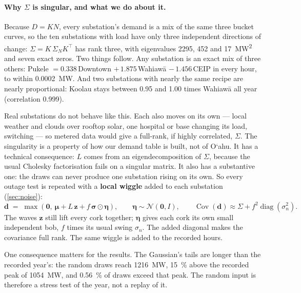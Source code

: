 \documentclass[11pt,a4paper]{article}
\newcommand{\okina}{\textquoteleft}
\newcommand{\Oahu}{O\okina ahu}
\begin{document}
\paragraph{Why $\Sigma$ is singular, and what we do about it.} Because $D = KN$,
every substation's demand is a mix of the same three bucket
curves, so the ten substations with load have only three independent directions of
change: $\Sigma = K\,\Sigma_N K^{\top}$ has rank three, with eigenvalues
\num{2295}, \num{452} and \SI{17}{MW^2} and seven exact zeros. Two things follow.
Any substation is an exact mix of three others: Pukele $= 0.338\,$Downtown
$+\,1.875\,$Wahiaw\=a $-\,1.456\,$CEIP in every hour, to within \SI{0.0002}{MW}. And two
substations with nearly the same recipe are nearly proportional: Koolau stays between
0.95 and 1.00 times Wahiaw\=a all year (correlation 0.999).

Real substations do not behave like this. Each also moves on its own --- local weather
and clouds over rooftop solar, one hospital or base changing its load, switching ---
so metered data would give a full-rank, if highly correlated, $\Sigma$. The singularity
is a property of how our demand table is built, not of \Oahu. It has a technical
consequence: $L$ comes from an eigendecomposition of $\Sigma$, because the usual
Cholesky factorisation fails on a singular matrix. It also has a substantive one: the
draws can never produce one substation rising on its own. So every outage test is
repeated with a \textbf{local wiggle} added to each substation (\cref{sec:noise}):
\begin{equation}
  \mathbf{d} \;=\; \max\!\left(\mathbf{0},\ \boldsymbol{\mu} + L\,\mathbf{z}
  + f\,\boldsymbol{\sigma}\odot\boldsymbol{\eta}\right),
  \qquad \boldsymbol{\eta} \sim \mathcal{N}(\mathbf{0}, I),
  \qquad \operatorname{Cov}(\mathbf{d}) \approx \Sigma + f^2\operatorname{diag}(\sigma_n^2).
  \label{eq:noise}
\end{equation}
The waves $\mathbf{z}$ still lift every cork together; $\boldsymbol{\eta}$ gives each cork
its own small independent bob, $f$ times its usual swing $\sigma_n$. The added
diagonal makes the covariance full rank. The same wiggle is added to the recorded
hours.

One consequence matters for the results. The Gaussian's tails are longer than the
recorded year's: the random draws reach \SI{1216}{MW}, \SI{15}{\percent} above the
recorded peak of \SI{1054}{MW}, and \SI{0.56}{\percent} of draws exceed that peak. The
random input is therefore a stress test of the year, not a replay of it.
\end{document}
